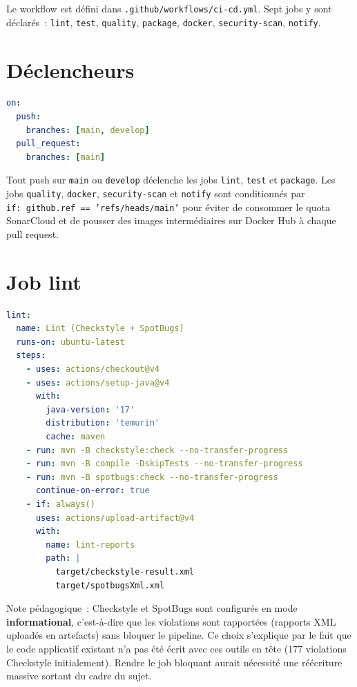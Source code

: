 \documentclass[12pt,a4paper]{report}
\begin{document}
Le workflow est défini dans \texttt{.github/workflows/ci-cd.yml}. Sept jobs y
sont déclarés~: \texttt{lint}, \texttt{test}, \texttt{quality}, \texttt{package},
\texttt{docker}, \texttt{security-scan}, \texttt{notify}.

\section{Déclencheurs}

\begin{lstlisting}[language=YAML, caption={Déclencheurs du workflow}]
on:
  push:
    branches: [main, develop]
  pull_request:
    branches: [main]
\end{lstlisting}

Tout push sur \texttt{main} ou \texttt{develop} déclenche les jobs
\texttt{lint}, \texttt{test} et \texttt{package}. Les jobs \texttt{quality},
\texttt{docker}, \texttt{security-scan} et \texttt{notify} sont conditionnés
par \texttt{if:\ github.ref == 'refs/heads/main'} pour éviter de consommer le
quota SonarCloud et de pousser des images intermédiaires sur Docker Hub à
chaque pull request.

\section{Job lint}

\begin{lstlisting}[language=YAML, caption={Job lint -- Checkstyle + SpotBugs}]
lint:
  name: Lint (Checkstyle + SpotBugs)
  runs-on: ubuntu-latest
  steps:
    - uses: actions/checkout@v4
    - uses: actions/setup-java@v4
      with:
        java-version: '17'
        distribution: 'temurin'
        cache: maven
    - run: mvn -B checkstyle:check --no-transfer-progress
    - run: mvn -B compile -DskipTests --no-transfer-progress
    - run: mvn -B spotbugs:check --no-transfer-progress
      continue-on-error: true
    - if: always()
      uses: actions/upload-artifact@v4
      with:
        name: lint-reports
        path: |
          target/checkstyle-result.xml
          target/spotbugsXml.xml
\end{lstlisting}

Note pédagogique~: Checkstyle et SpotBugs sont configurés en mode
\textbf{informational}, c'est-à-dire que les violations sont rapportées
(rapports XML uploadés en artefacts) sans bloquer le pipeline. Ce choix
s'explique par le fait que le code applicatif existant n'a pas été écrit avec
ces outils en tête (177 violations Checkstyle initialement). Rendre le job
bloquant aurait nécessité une réécriture massive sortant du cadre du sujet.
\end{document}
